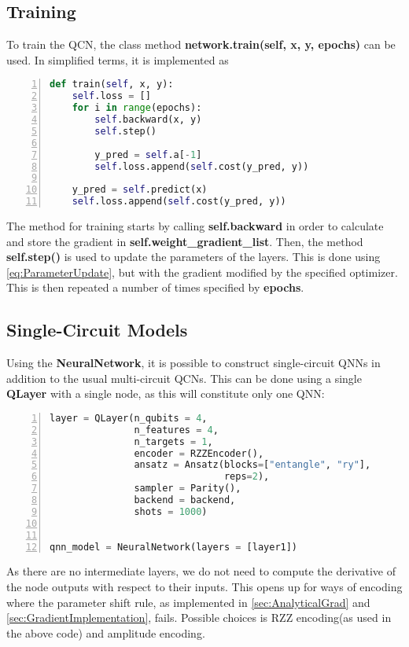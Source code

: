 \subsection{Training}\label{sec:QCNTraining}
To train the QCN, the class method \textbf{network.train(self, x, y, epochs)} can be used. In simplified terms, it is implemented as

\begin{lstlisting}[language=python, numbers=left]
def train(self, x, y):
    self.loss = []
    for i in range(epochs):
        self.backward(x, y)
        self.step()

        y_pred = self.a[-1]
        self.loss.append(self.cost(y_pred, y))
            
    y_pred = self.predict(x)
    self.loss.append(self.cost(y_pred, y))
\end{lstlisting}
The method for training starts by calling \textbf{self.backward} in order to calculate and store the gradient in \textbf{self.weight\_gradient\_list}. Then, the method \textbf{self.step()} is used to update the parameters of the layers. This is done using \autoref{eq:ParameterUpdate}, but with the gradient modified by the specified optimizer. This is then repeated a number of times specified by \textbf{epochs}.

\subsection{Single-Circuit Models}\label{sec:Single-CircuitModel}
Using the \textbf{NeuralNetwork}, it is possible to construct single-circuit QNNs in addition to the usual multi-circuit QCNs. This can be done using a single \textbf{QLayer} with a single node, as this will constitute only one QNN:
\begin{lstlisting}[language=python, numbers=left]
layer = QLayer(n_qubits = 4,
               n_features = 4,
               n_targets = 1,
               encoder = RZZEncoder(),
               ansatz = Ansatz(blocks=["entangle", "ry"],
                               reps=2),
               sampler = Parity(),
               backend = backend,
               shots = 1000)
                               

qnn_model = NeuralNetwork(layers = [layer1])
\end{lstlisting}
As there are no intermediate layers, we do not need to compute the derivative of the node outputs with respect to their inputs. This opens up for ways of encoding where the parameter shift rule, as implemented in \autoref{sec:AnalyticalGrad} and \autoref{sec:GradientImplementation}, fails. Possible choices is RZZ encoding(as used in the above code) and amplitude encoding.

